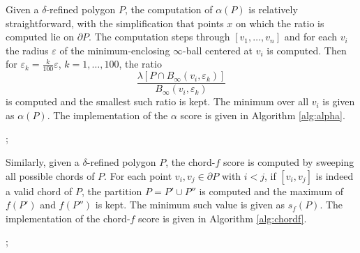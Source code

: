 \documentclass[]{jocg}
\theoremstyle{definition}
\theoremstyle{remark}
\begin{document}
Given a $\delta$-refined polygon $P$, the computation of $\alpha(P)$ is
relatively straightforward, with the simplification that points $x$ on which the
ratio is computed lie on $\partial P$. The computation steps through $[v_1,
\dots, v_n]$ and for each $v_i$ the radius $\varepsilon$ of the
minimum-enclosing $\infty$-ball centered at $v_i$ is computed. Then for
$\varepsilon_k = \frac{k}{100} \varepsilon$, $k = 1, \dots, 100$, the ratio 
\begin{equation*}
  \frac{\lambda[P \cap B_{\infty}(v_i, \varepsilon_k)]}{B_{\infty}(v_i,
  \varepsilon_k)}
\end{equation*}
is computed and the smallest such ratio is kept. The minimum over all $v_i$ is
given as $\alpha(P)$. The implementation of the $\alpha$ score is given in
Algorithm \ref{alg:alpha}. 


\begin{algorithm}[h]
  \begin{algorithmic}[0]
    ;
     
      \EndIf
      \EndFor
      \EndFor
      \EndFunction
    \end{algorithmic}
  \label{alg:alpha}
\end{algorithm}

Similarly, given a $\delta$-refined polygon $P$, the chord-$f$ score is computed
by sweeping all possible chords of $P$. For each point $v_i, v_j \in \partial P$
with $i < j$, if $[v_i, v_j]$ is indeed a valid chord of $P$, the partition $P =
P' \cup P''$ is computed and the maximum of $f(P')$ and $f(P'')$ is kept. The
minimum such value is given as $s_f(P)$. The implementation of the chord-$f$
score is given in Algorithm \ref{alg:chordf}.


\begin{algorithm}[h]
\begin{algorithmic}[0]
  ;
      \EndIf
    \EndIf
  \EndFor
  \EndFor
  \EndFunction
\end{algorithmic}
\label{alg:chordf}
\end{algorithm}
\end{document}
